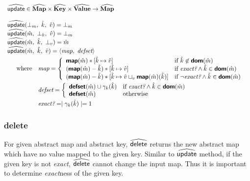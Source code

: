 $\begin{array}{l}
\wsf{update} \in \AMap \times \AKey \times \AVal \rightarrow \AMap \\\\

\wsf{update}(\bot_m,\ \hat{k},\ \hat{v}) = \bot_m \\
\wsf{update}(\hat{m},\ \bot_k,\ \hat{v}) = \bot_m \\
\wsf{update}(\hat{m},\ \hat{k},\ \bot_{v}) = \hat{m} \\

\wsf{update}(\hat{m},\ \hat{k},\ \hat{v}) = \langle \emph{map},\ \emph{defset} \rangle \vspace{1mm}\\
\quad \begin{array}{rl} \textrm{where}
& \emph{map} = \left \{ \begin{array}{ll}
\Map(\hat{m}) \ast [ \hat{k} \mapsto \hat{v} ]
& \textrm{if } \hat{k} \not\in \Dom(\hat{m}) \\

(\Map(\hat{m}) - \hat{k}) \ast [ \hat{k} \mapsto \hat{v}]
& \textrm{if } \emph{exact?} \land \hat{k}\in \Dom(\hat{m}) \\

(\Map(\hat{m}) - \hat{k})
\ast [ \hat{k} \mapsto \hat{v} \sqcup_v \Map(\hat{m})(\hat{k}) ]
& \textrm{if } \neg \emph{exact?} \land \hat{k}\in \Dom(\hat{m}) \\
\end{array} \right. \vspace{1mm}\\

& \emph{defset} = \left \{ \begin{array}{ll}
\Defset(\hat{m}) \cup \gamma_k(\hat{k}) & \textrm{if} ~ \emph{exact?} \land \hat{k}\in \Dom(\hat{m}) \\
\Defset(\hat{m}) & \textrm{otherwise}\\
\end{array} \right. \vspace{1mm}\\

& \emph{exact?} = \mid \gamma_k(\hat{k}) \mid = 1 \\
\end{array} \\
\end{array} $

\subsubsection{delete}
For given abstract map and abstract key, 
$\widehat{\textsf{delete}}$ returns the new abstract map 
which have no value mapped to the given key.
Similar to $\widehat{\textsf{update}}$ method, 
if the given key is not \emph{exact},
$\widehat{\textsf{delete}}$ cannot change the input map.
Thus it is important to determine \emph{exact}ness of the given key.\\

